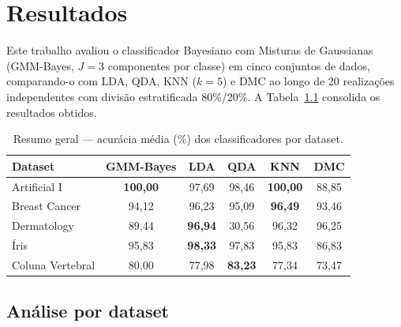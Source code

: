 
\chapter{Resultados}

 
Este trabalho avaliou o classificador Bayesiano com Misturas de Gaussianas (GMM-Bayes,
$J=3$ componentes por classe) em cinco conjuntos de dados, comparando-o com LDA, QDA,
KNN ($k=5$) e DMC ao longo de 20 realizações independentes com divisão estratificada
80\%/20\%. A Tabela~\ref{tab:resumo_geral} consolida os resultados obtidos.
 
\begin{table}[htbp]
  \centering
  \caption{Resumo geral — acurácia média (\%) dos classificadores por dataset.}
  \label{tab:resumo_geral}
  \begin{tabular}{lccccc}
    \hline
    \textbf{Dataset}      & \textbf{GMM-Bayes} & \textbf{LDA}  & \textbf{QDA}  & \textbf{KNN}  & \textbf{DMC}  \\
    \hline
    Artificial I          & \textbf{100,00}    & 97,69         & 98,46         & \textbf{100,00} & 88,85       \\
    Breast Cancer         & 94,12              & 96,23         & 95,09         & \textbf{96,49}  & 93,46       \\
    Dermatology           & 89,44              & \textbf{96,94} & 30,56        & 96,32         & 96,25       \\
    Íris                  & 95,83              & \textbf{98,33} & 97,83        & 95,83         & 86,83       \\
    Coluna Vertebral      & 80,00              & 77,98         & \textbf{83,23} & 77,34        & 73,47       \\
    \hline
  \end{tabular}
\end{table}

\section{Análise por dataset}

